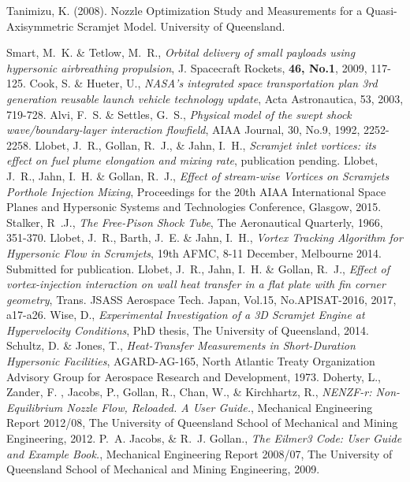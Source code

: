 \documentclass{AIAA}
\begin{document}
\begin{thebibliography}{}
Tanimizu, K. (2008). Nozzle Optimization Study and Measurements for a Quasi-Axisymmetric Scramjet Model. University of Queensland.


Smart, M.~K. \& Tetlow, M.~R., {\it Orbital delivery of small payloads using hypersonic airbreathing propulsion}, J. Spacecraft Rockets, {\bf 46, No.1}, 2009, 117-125.
Cook, S. \& Hueter, U., {\it NASA's integrated space transportation plan 3rd generation reusable launch vehicle technology update}, Acta Astronautica, 53, 2003, 719-728.
Alvi, F.~S. \& Settles, G.~S., {\it Physical model of the swept shock wave/boundary-layer interaction flowfield}, AIAA Journal, 30, No.9, 1992, 2252-2258.
Llobet, J.~R., Gollan, R.~J., \& Jahn, I.~H., {\it Scramjet inlet vortices: its effect on fuel plume elongation and mixing rate}, publication pending.
Llobet, J.~R., Jahn, I.~H. \& Gollan, R.~J., {\it Effect of stream-wise Vortices on Scramjets Porthole Injection Mixing}, Proceedings for the 20th AIAA International Space Planes and Hypersonic Systems and Technologies Conference, Glasgow, 2015. 
Stalker, R~.J., {\it The Free-Pison Shock Tube}, The Aeronautical Quarterly, 1966, 351-370.
Llobet, J.~R., Barth, J.~E. \& Jahn, I.~H., {\it Vortex Tracking Algorithm for Hypersonic Flow in Scramjets}, 19th AFMC, 8-11 December, Melbourne 2014. Submitted for publication.
Llobet, J.~R., Jahn, I.~H. \& Gollan, R.~J., {\it Effect of vortex-injection interaction on wall heat transfer in a flat plate with fin corner geometry}, Trans. JSASS Aerospace Tech. Japan, Vol.15, No.APISAT-2016, 2017, a17-a26. 
Wise, D., {\it Experimental Investigation of a 3D Scramjet Engine at Hypervelocity Conditions}, PhD thesis, The University of Queensland, 2014.
Schultz, D. \& Jones, T., {\it Heat-Transfer Measurements in Short-Duration Hypersonic Facilities}, AGARD-AG-165, North Atlantic Treaty Organization Advisory Group for Aerospace Research and Development, 1973.
Doherty, L., Zander, F. , Jacobs, P., Gollan, R., Chan, W., \& Kirchhartz, R., {\it NENZF-r: Non-Equilibrium Nozzle Flow, Reloaded. A User Guide.}, Mechanical Engineering Report 2012/08, The University of Queensland School of Mechanical and Mining Engineering, 2012.
P.~A. Jacobs, \& R.~J. Gollan., {\it The Eilmer3 Code: User Guide and Example Book.}, Mechanical Engineering Report 2008/07, The University of Queensland School of Mechanical and Mining Engineering, 2009.

\end{thebibliography}
\end{document}
